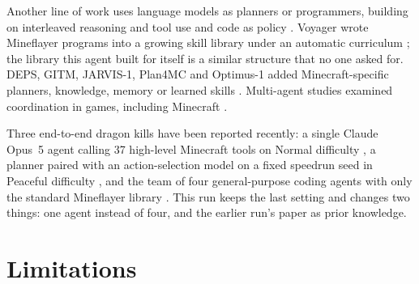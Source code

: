 \documentclass[11pt,a4paper]{article}
\begin{document}
Another line of work uses language models as planners or programmers, building on interleaved reasoning and tool use \citep{yao2023react} and code as policy \citep{liang2023code}. Voyager wrote Mineflayer programs into a growing skill library under an automatic curriculum \citep{wang2024voyager}; the library this agent built for itself is a similar structure that no one asked for. DEPS, GITM, JARVIS-1, Plan4MC and Optimus-1 added Minecraft-specific planners, knowledge, memory or learned skills \citep{wang2023deps,zhu2023gitm,wang2025jarvis,yuan2023plan4mc,li2024optimus}. Multi-agent studies examined coordination in games, including Minecraft \citep{gong2024mindagent,altera2024sid,white2025collaborating}.

Three end-to-end dragon kills have been reported recently: a single Claude Opus~5 agent calling 37 high-level Minecraft tools on Normal difficulty \citep{aibengineering2026}, a planner paired with an action-selection model on a fixed speedrun seed in Peaceful difficulty \citep{malde2026astra}, and the team of four general-purpose coding agents with only the standard Mineflayer library \citep{faldor2026team}. This run keeps the last setting and changes two things: one agent instead of four, and the earlier run's paper as prior knowledge.

\section{Limitations}
\end{document}
